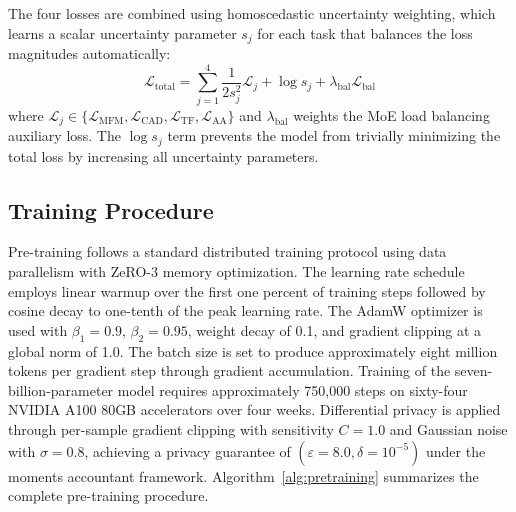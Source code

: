 \documentclass[journal]{IEEEtran}
\begin{document}
The four losses are combined using homoscedastic uncertainty weighting, which learns a scalar uncertainty parameter $s_j$ for each task that balances the loss magnitudes automatically:
\begin{equation}
\mathcal{L}_{\text{total}} = \sum_{j=1}^{4} \frac{1}{2s_j^2} \mathcal{L}_j + \log s_j + \lambda_{\text{bal}} \mathcal{L}_{\text{bal}}
\label{eq:total_loss}
\end{equation}
where $\mathcal{L}_j \in \{\mathcal{L}_{\text{MFM}}, \mathcal{L}_{\text{CAD}}, \mathcal{L}_{\text{TF}}, \mathcal{L}_{\text{AA}}\}$ and $\lambda_{\text{bal}}$ weights the MoE load balancing auxiliary loss. The $\log s_j$ term prevents the model from trivially minimizing the total loss by increasing all uncertainty parameters.

\subsection{Training Procedure}
\label{subsec:training_procedure}

Pre-training follows a standard distributed training protocol using data parallelism with ZeRO-3 memory optimization. The learning rate schedule employs linear warmup over the first one percent of training steps followed by cosine decay to one-tenth of the peak learning rate. The AdamW optimizer is used with $\beta_1 = 0.9$, $\beta_2 = 0.95$, weight decay of 0.1, and gradient clipping at a global norm of 1.0. The batch size is set to produce approximately eight million tokens per gradient step through gradient accumulation. Training of the seven-billion-parameter model requires approximately 750,000 steps on sixty-four NVIDIA A100 80GB accelerators over four weeks. Differential privacy is applied through per-sample gradient clipping with sensitivity $C = 1.0$ and Gaussian noise with $\sigma = 0.8$, achieving a privacy guarantee of $(\varepsilon = 8.0, \delta = 10^{-5})$ under the moments accountant framework. Algorithm~\ref{alg:pretraining} summarizes the complete pre-training procedure.
\end{document}
